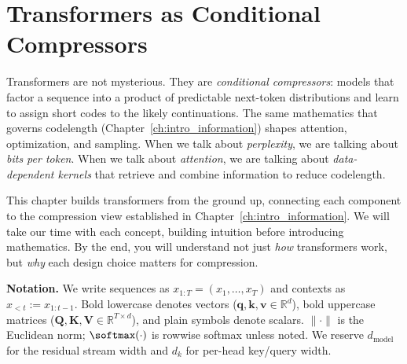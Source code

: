 
\chapter{Transformers as Conditional Compressors}
\label{ch:transformers}

\begin{keyinsight}
Transformers are not mysterious. They are \emph{conditional compressors}: models that factor a sequence into a product of predictable next-token distributions and learn to assign short codes to the likely continuations. The same mathematics that governs codelength (Chapter~\ref{ch:intro_information}) shapes attention, optimization, and sampling. When we talk about \emph{perplexity}, we are talking about \emph{bits per token}. When we talk about \emph{attention}, we are talking about \emph{data-dependent kernels} that retrieve and combine information to reduce codelength.
\end{keyinsight}

\vspace{0.6em}

\noindent This chapter builds transformers from the ground up, connecting each component to the compression view established in Chapter~\ref{ch:intro_information}. We will take our time with each concept, building intuition before introducing mathematics. By the end, you will understand not just \emph{how} transformers work, but \emph{why} each design choice matters for compression.

\begin{notationbox}
\textbf{Notation.} We write sequences as $x_{1:T} = (x_1,\dots,x_T)$ and contexts as $x_{<t} := x_{1:t-1}$. Bold lowercase denotes vectors ($\mathbf{q},\mathbf{k},\mathbf{v}\in\mathbb{R}^{d}$), bold uppercase matrices ($\mathbf{Q},\mathbf{K},\mathbf{V}\in\mathbb{R}^{T\times d}$), and plain symbols denote scalars. $\|\cdot\|$ is the Euclidean norm; $\softmax(\cdot)$ is rowwise softmax unless noted. We reserve $d_{\text{model}}$ for the residual stream width and $d_k$ for per-head key/query width.
\end{notationbox}

\vspace{1em}

